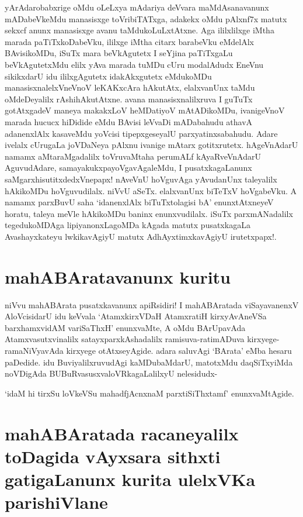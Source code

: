 yArAdarobabxrige oMdu oLeLxya mAdariya deVvara maMdAsanavanunx mADabeVkeMdu manasisxge toVribiTATxga, adakekx oMdu pAlxnf7x matutx sekxcf anunx manasisxge avanu taMdukoLuLxtAtxne. Aga ililxlilxge iMtha marada paTiTxkoDabeVku, ililxge iMtha citarx barabeVku eMdelAlx BAvisikoMDu, iSuTx mara beVkAgutetx I seYjina paTiTxgaLu beVkAgutetxMdu elilx yAva marada tuMDu cUru modalAdudx EneVnu sikikxdarU idu ililxgAgutetx idakAkxgutetx eMdukoMDu manasisxnalelxVneVnoV leKAKxcAra hAkutAtx, elalxvanUnx taMdu oMdeDeyalilx rAshihAkutAtxne. avana manasisxnalilxruva I guTuTx gotAtxgadeV maneya makakxLoV heMDatiyoV mAtADikoMDu, ivanigeVnoV marada hucucx hiDidide eMdu BAvisi leVvaDi mADabahudu athavA adanenxlAlx kasaveMdu yoVcisi tipepxgeseyalU parxyatinxsabahudu. Adare ivelalx cUrugaLa joVDaNeya pAlxnu ivanige mAtarx gotitxrutetx. hAgeVnAdarU namamx aMtaraMgadalilx toVruvaMtaha perumALf kAyaRveVnAdarU AguvudAdare, samayakukxpayoVgavAgaleMdu, I pusatxkagaLanunx saMgarxhisutitxdedxVnepapx! nAveVnU hoVguvAga yAvudanUnx taleyalilx hAkikoMDu hoVguvudilalx. niVvU aSeTx. elalxvanUnx biTeTxV hoVgabeVku. A namamx parxBuvU saha `idanenxlAlx biTuTxtolagisi bA' enunxtAtxneyeV horatu, taleya meVle hAkikoMDu baninx enunxvudilalx. iSuTx  parxmANadalilx tegedukoMDAga lipiyanonxLagoMDa kAgada matutx pusatxkagaLa Avashayxkateyu lwkikavAgiyU matutx AdhAyxtimxkavAgiyU irutetxpapx!.

\section*{mahABAratavanunx kuritu}

niVvu mahABArata pusatxkavanunx apiRsidiri! I mahABAratada viSayavanenxV AloVcisidarU idu keVvala `AtamxkirxVDaH AtamxratiH\label{118} kirxyAvAneVSa barxhamxvidAM variSaThxH' enunxvaMte, A oMdu BArUpavAda Atamxvasutxvinalilx satayxparxkAshadalilx ramisuva-ratimADuva kirxyege- ramaNiVyavAda kirxyege otAtxseyAgide. adara saluvAgi `BArata' eMba hesaru paDedide. idu BuviyalilxruvudAgi kaMDubaMdarU, matotxMdu daqSiTxyiMda noVDigAda BUBuRvasusxvaloVRkagaLalilxyU nelesidudx-

\begin{shloka}
`idaM hi tirxSu loVkeVSu\label{118a} mahadfjAcnxnaM parxtiSiThxtamf' enunxvaMtAgide.
\end{shloka}

\section*{mahABAratada racaneyalilx toDagida vAyxsara sithxti gatigaLanunx kurita ulelxVKa parishiVlane}

